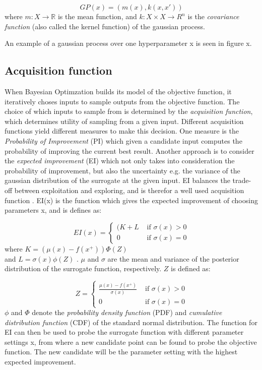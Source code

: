 \begin{equation}\label{gaussian-process}
GP(x) = (m(x), k(x, x'))
\end{equation}
where $m : X \rightarrow \mathbb{R}$ is the mean function, and $k : X \times X \rightarrow R^n$ is the \emph{covariance function} (also called the kernel function) of the gaussian process.

An example of a gaussian process over one hyperparameter x is seen in figure x. 

\subsection{Acquisition function}
When Bayesian Optimzation builds its model of the objective function, it iteratively choses inputs to sample outputs from the objective function. The choice of which inputs to sample from is determined by the \emph{acquisition function}, which determines utility of sampling from a given input. Different acquisition functions yield different measures to make this decision. One measure is the \emph{Probability of Improvement} (PI) which given a candidate input computes the probability of improving the current best result.  Another approach is to consider the \emph{expected improvement} (EI) which not only takes into consideration the  probability of improvement, but also the uncertainty e.g. the variance of the gaussian distribution of the surrogate at the given input.
EI balances the trade-off between exploitation and exploring, and is therefor a well used acquisition function \citet{brochu2010tutorial}. EI(x) is the function which gives the expected improvement of choosing parameters x, and is defines as:

\begin{equation}
\label{eq:expected-improvement}
EI(x) =
\begin{cases}
   (K + L & \text{ if } \sigma(x) > 0\\
   0 	  & \text{ if } \sigma(x) = 0
\end{cases}
\end{equation}
where $K = (\mu(x) - f(x^+))\Phi(Z)$ \\and $L = \sigma(x)\phi(Z)$ .
$\mu$ and $\sigma$ are the mean and variance of the posterior distribution of the surrogate function, respectively. $Z$ is defined as:

\begin{equation}
\label{eq:expect-z}
Z =
\begin{cases}
\frac{\mu(x) - f(x^+)}{\sigma(x)} & \text{ if } \sigma(x) > 0\\
0 								  & \text{ if } \sigma(x) = 0
\end{cases}
\end{equation}
$\phi$ and $\Phi$ denote the \emph{probability density function} (PDF) and \emph{cumulative distribution function} (CDF) of the standard normal distribution.
The function for EI can then be used to probe the surrogate function with different parameter settings x, from where a new candidate point can be found to probe the objective function. The new candidate will be the parameter setting with the highest expected improvement.  


